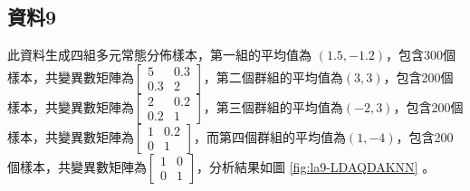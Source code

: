 \documentclass[12pt, a4paper]{article}
\begin{document}
\subsection{資料9}
此資料生成四組多元常態分佈樣本，第一組的平均值為 $(1.5, -1.2)$，包含300個樣本，共變異數矩陣為$\begin{bmatrix}5 & 0.3 \\0.3 & 2 \end{bmatrix}$，第二個群組的平均值為$(3, 3)$，包含200個樣本，共變異數矩陣為$\begin{bmatrix}2 & 0.2 \\0.2 & 1 \end{bmatrix}$，第三個群組的平均值為$(-2, 3)$，包含200個樣本，共變異數矩陣為$\begin{bmatrix}1 & 0.2 \\0 & 1 \end{bmatrix}$，而第四個群組的平均值為$(1, -4)$，包含200個樣本，共變異數矩陣為$\begin{bmatrix}1 & 0 \\0 & 1 \end{bmatrix}$，分析結果如圖 \ref{fig:la9-LDAQDAKNN} 。
\end{document}
